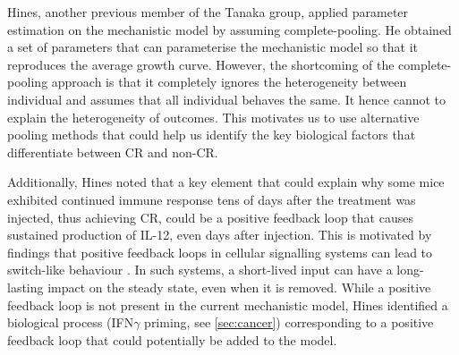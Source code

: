 \documentclass[11pt]{article}
\begin{document}
Hines, another previous member of the Tanaka group, applied parameter estimation on the mechanistic model by assuming complete-pooling. He obtained a set of parameters that can parameterise the mechanistic model so that it reproduces the average growth curve. However, the shortcoming of the complete-pooling approach is that it completely ignores the heterogeneity between individual and assumes that all individual behaves the same. It hence cannot to explain the heterogeneity of outcomes. This motivates us to use alternative pooling methods that could help us identify the key biological factors that differentiate between CR and non-CR.

Additionally, Hines noted that a key element that could explain why some mice exhibited continued immune response tens of days after the treatment was injected, thus achieving CR, could be a positive feedback loop that causes sustained production of IL-12, even days after injection. This is motivated by findings that positive feedback loops in cellular signalling systems can lead to switch-like behaviour \cite{bistable}. In such systems, a short-lived input can have a long-lasting impact on the steady state, even when it is removed. While a positive feedback loop is not present in the current mechanistic model, Hines identified a biological process (IFN$\gamma$ priming, see \ref{sec:cancer}) corresponding to a positive feedback loop that could potentially be added to the model.


\end{document}
